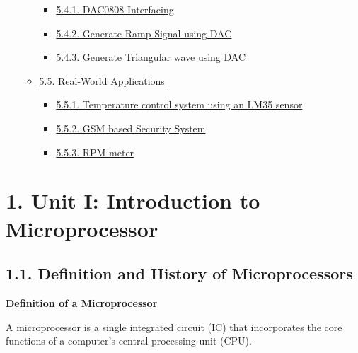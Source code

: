\documentclass[
]{article}
\begin{document}
\begin{itemize}
\begin{itemize}
    \begin{itemize}
    \item
      \protect\hyperlink{541-dac0808-interfacing}{5.4.1. DAC0808
      Interfacing}
    \item
      \protect\hyperlink{542-generate-ramp-signal-using-dac}{5.4.2.
      Generate Ramp Signal using DAC}
    \item
      \protect\hyperlink{543-generate-triangular-wave-using-dac}{5.4.3.
      Generate Triangular wave using DAC}
    \end{itemize}
  \item
    \protect\hyperlink{55-real-world-applications}{5.5. Real-World
    Applications}

    \begin{itemize}
    \item
      \protect\hyperlink{551-temperature-control-system-using-an-lm35-sensor}{5.5.1.
      Temperature control system using an LM35 sensor}
    \item
      \protect\hyperlink{552-gsm-based-security-system}{5.5.2. GSM based
      Security System}
    \item
      \protect\hyperlink{553-rpm-meter}{5.5.3. RPM meter}
    \end{itemize}
  \end{itemize}
\end{itemize}

\hypertarget{1-unit-i-introduction-to-microprocessor}{%
\section{1. Unit I: Introduction to
Microprocessor}\label{1-unit-i-introduction-to-microprocessor}}

\hypertarget{11-definition-and-history-of-microprocessors}{%
\subsection{1.1. Definition and History of
Microprocessors}\label{11-definition-and-history-of-microprocessors}}

\textbf{Definition of a Microprocessor}

A microprocessor is a single integrated circuit (IC) that incorporates
the core functions of a computer's central processing unit (CPU).
\end{document}
